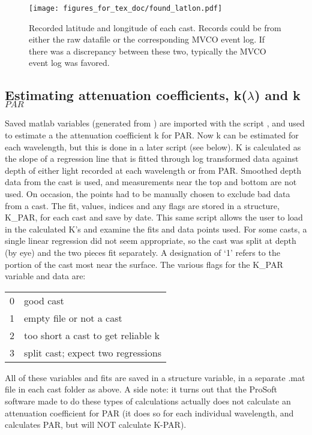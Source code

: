\documentclass[11pt]{article}
\begin{document}
 \begin{figure}[h]
\centering
\texttt{[image: figures\_for\_tex\_doc/found\_latlon.pdf]}
\caption{Recorded latitude and longitude of each cast. Records could be from either the raw datafile or the corresponding MVCO event log. If there was a discrepancy between these two, typically the MVCO event log was favored.}
\end{figure}

\clearpage

\subsection{Estimating attenuation coefficients, k($\lambda$) and k$_{PAR}$}

Saved matlab variables (generated from ) are imported with the script , and used to estimate a the attenuation coefficient k for PAR. Now k can be estimated for each wavelength, but this is done in a later script (see below). K is calculated as the slope of a regression line that is fitted through log transformed data against depth of either light recorded at each wavelength or from PAR.  Smoothed depth data from the cast is used, and measurements near the top and bottom are not used. On occasion, the points had to be manually chosen to exclude bad data from a cast. The fit, values, indices and any flags are stored in a structure, K\_PAR, for each cast and save by date. This same script allows the user to load in the calculated K's and examine the fits and data points used. For some casts, a single linear regression did not seem appropriate, so the cast was split at depth (by eye) and the two pieces fit separately. A designation of `1' refers to the portion of the cast most near the surface. The various flags for the K\_PAR variable and data are:


\begin{table}[h]
\begin{center}
\begin{tabular}{| l | l |}
\hline
0 & good cast \\
1 & empty file or not a cast \\
2 & too short a cast to get reliable k \\
3 & split cast; expect two regressions \\
\hline
\end{tabular}
\end{center}
\end{table}
\vspace{-5mm}
\noindent All of these variables and fits are saved in a structure variable, in a separate .mat file in each cast folder as above. A side note: it turns out that the ProSoft software made to do these types of calculations actually does not calculate an attenuation coefficient for PAR (it does so for each individual wavelength, and calculates PAR, but will NOT calculate K-PAR). 
\end{document}
